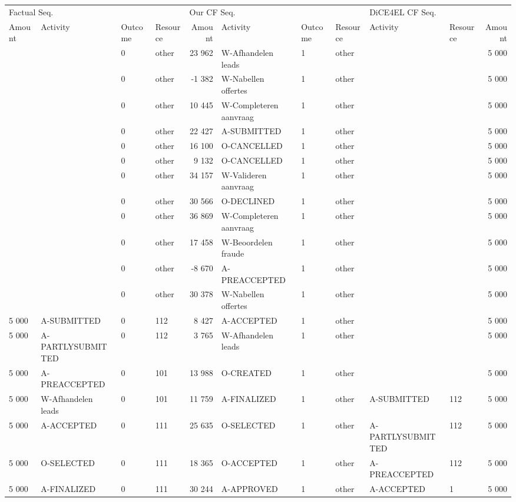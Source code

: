 \begin{tabular}{llllrlllllr}
\toprule
\multicolumn{4}{l}{Factual Seq.} & \multicolumn{4}{l}{Our CF Seq.} & \multicolumn{3}{l}{DiCE4EL CF Seq.} \\
Amount & Activity & Outcome & Resource & Amount & Activity & Outcome & Resource & Activity & Resource & Amount \\
\midrule
 &  & 0 & other & 23 962 & W-Afhandelen leads & 1 & other &  &  & 5 000 \\
 &  & 0 & other & -1 382 & W-Nabellen offertes & 1 & other &  &  & 5 000 \\
 &  & 0 & other & 10 445 & W-Completeren aanvraag & 1 & other &  &  & 5 000 \\
 &  & 0 & other & 22 427 & A-SUBMITTED & 1 & other &  &  & 5 000 \\
 &  & 0 & other & 16 100 & O-CANCELLED & 1 & other &  &  & 5 000 \\
 &  & 0 & other & 9 132 & O-CANCELLED & 1 & other &  &  & 5 000 \\
 &  & 0 & other & 34 157 & W-Valideren aanvraag & 1 & other &  &  & 5 000 \\
 &  & 0 & other & 30 566 & O-DECLINED & 1 & other &  &  & 5 000 \\
 &  & 0 & other & 36 869 & W-Completeren aanvraag & 1 & other &  &  & 5 000 \\
 &  & 0 & other & 17 458 & W-Beoordelen fraude & 1 & other &  &  & 5 000 \\
 &  & 0 & other & -8 670 & A-PREACCEPTED & 1 & other &  &  & 5 000 \\
 &  & 0 & other & 30 378 & W-Nabellen offertes & 1 & other &  &  & 5 000 \\
5 000 & A-SUBMITTED & 0 & 112 & 8 427 & A-ACCEPTED & 1 & other &  &  & 5 000 \\
5 000 & A-PARTLYSUBMITTED & 0 & 112 & 3 765 & W-Afhandelen leads & 1 & other &  &  & 5 000 \\
5 000 & A-PREACCEPTED & 0 & 101 & 13 988 & O-CREATED & 1 & other &  &  & 5 000 \\
5 000 & W-Afhandelen leads & 0 & 101 & 11 759 & A-FINALIZED & 1 & other & A-SUBMITTED & 112 & 5 000 \\
5 000 & A-ACCEPTED & 0 & 111 & 25 635 & O-SELECTED & 1 & other & A-PARTLYSUBMITTED & 112 & 5 000 \\
5 000 & O-SELECTED & 0 & 111 & 18 365 & O-ACCEPTED & 1 & other & A-PREACCEPTED & 112 & 5 000 \\
5 000 & A-FINALIZED & 0 & 111 & 30 244 & A-APPROVED & 1 & other & A-ACCEPTED & 1 & 5 000 \\

\end{tabular}
